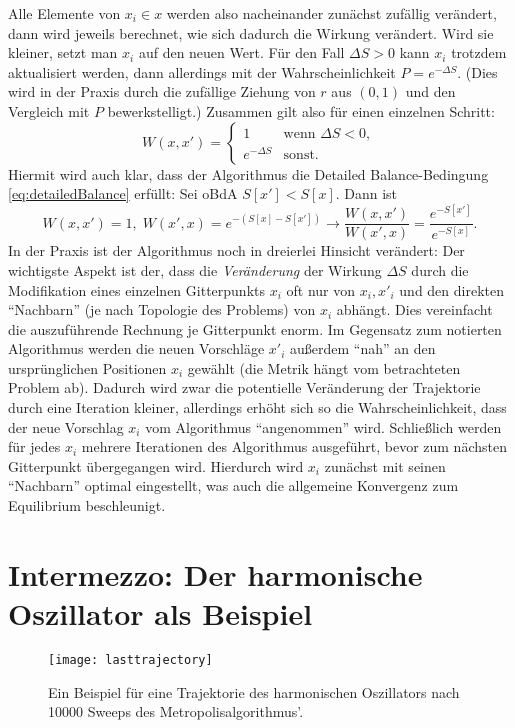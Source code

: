 Alle Elemente von $x_i \in x$ werden also nacheinander zunächst zufällig
verändert, dann wird jeweils berechnet, wie sich dadurch die Wirkung verändert.
Wird sie kleiner, setzt man $x_i$ auf den neuen Wert. Für den Fall
$\Delta S > 0$ kann $x_i$ trotzdem aktualisiert werden, dann allerdings mit
der Wahrscheinlichkeit $P = e^{-\Delta S}$. (Dies wird in der Praxis durch die
zufällige Ziehung von $r$ aus $(0,1)$ und den Vergleich mit $P$ bewerkstelligt.)
Zusammen gilt also für einen einzelnen Schritt:
\[
W(x,x') =
\begin{cases}
    1 & \text{wenn } \Delta S < 0, \\
    e^{-\Delta S} & \text{sonst}.
\end{cases}
\]
Hiermit wird auch klar, dass der Algorithmus die Detailed Balance-Bedingung
\eqref{eq:detailedBalance} erfüllt: Sei oBdA $S[x'] < S[x]$. Dann ist
\[
W(x,x') = 1, \; W(x',x) = e^{-\left( S[x] - S[x'] \right)}
\rightarrow \frac{W(x,x')}{W(x',x)} = \frac{e^{-S[x']}}{e^{-S[x]}}.
\]
In der Praxis ist der Algorithmus noch in dreierlei Hinsicht verändert: Der
wichtigste Aspekt ist der, dass die \emph{Veränderung} der Wirkung $\Delta S$ durch
die Modifikation eines einzelnen Gitterpunkts $x_i$ oft nur von $x_i, x'_i$ und
den direkten \enquote{Nachbarn} (je nach Topologie des Problems) von $x_i$
abhängt. Dies vereinfacht die auszuführende Rechnung je Gitterpunkt enorm.
Im Gegensatz zum notierten Algorithmus werden die neuen Vorschläge $x'_i$
außerdem \enquote{nah} an den ursprünglichen Positionen $x_i$ gewählt (die Metrik hängt
vom betrachteten Problem ab). Dadurch wird zwar die potentielle Veränderung der
Trajektorie durch eine Iteration kleiner, allerdings erhöht sich so die
Wahrscheinlichkeit, dass der neue Vorschlag $x_i$ vom Algorithmus
\enquote{angenommen} wird. Schließlich werden für jedes $x_i$ mehrere
Iterationen des Algorithmus ausgeführt, bevor zum nächsten Gitterpunkt übergegangen
wird. Hierdurch wird $x_i$ zunächst mit seinen \enquote{Nachbarn} optimal
eingestellt, was auch die allgemeine Konvergenz zum Equilibrium beschleunigt.

\section{Intermezzo: Der harmonische Oszillator als Beispiel}

\begin{figure}[htbp]
    \centering
    \texttt{[image: lasttrajectory]}
    \caption{Ein Beispiel für eine Trajektorie des harmonischen Oszillators
    nach 10000 Sweeps des Metropolisalgorithmus'.}
    \label{fig:lastTrajectory}
\end{figure}

